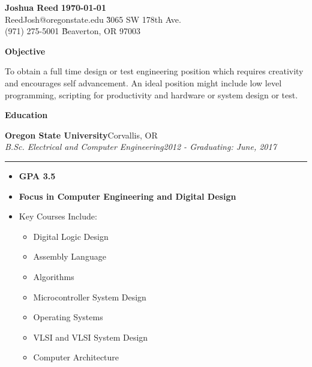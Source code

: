 \documentclass[margin, line]{res}
\newcommand{\resheading}[1]{
  \begin{tcolorbox}[width=\textwidth,
                    frame hidden,
                    colback=black!30,
                    enhanced,
                    top=0pt,
                    bottom=0pt,
                    height=16pt
                    ]
      \bf #1
  \end{tcolorbox}
  }
\newcommand{\ressubheading}[4]{
  \begin{minipage}{\textwidth}
  {\textbf{#1}\hfill #2} \\
  {\textit{#3}\hfill \textit{#4}}
  \end{minipage}
  \rule{\textwidth}{1pt}
  }
\begin{document}

\begin{tabbing}
  \textbf{\Large Joshua Reed} \` \textbf{\today} \\
  ReedJosh@oregonstate.edu    \` 3065 SW 178th Ave. \\
  (971) 275-5001              \` Beaverton, OR 97003 \\ 
\end{tabbing}

\resheading{Objective}

To obtain a full time design or test engineering position 
which requires creativity and encourages self advancement. An ideal position might 
include low level programming, scripting for productivity and  hardware or 
system design or test.


\resheading{Education}

\ressubheading{Oregon State University}
              {Corvallis, OR}
              {B.Sc. Electrical and Computer Engineering}
              {2012 - Graduating: June, 2017}
\begin{itemize}[nolistsep, noitemsep, topsep=0pt]
  \item{\bf GPA 3.5}
  \item{\bf Focus in Computer Engineering and Digital Design} 
  \item Key Courses Include:
    \setlength{\multicolsep}{0pt}
    \begin{multicols}{2}    
      \begin{itemize}[nolistsep,noitemsep,topsep=0pt]
        \item Digital Logic Design  
        \item Assembly Language 
        \item Algorithms 
        \item Microcontroller System Design 
        \item Operating Systems 
        \item VLSI and VLSI System Design 
        \item Computer Architecture 
      \end{itemize}
    \end{multicols}
\end{itemize}
\end{document}
